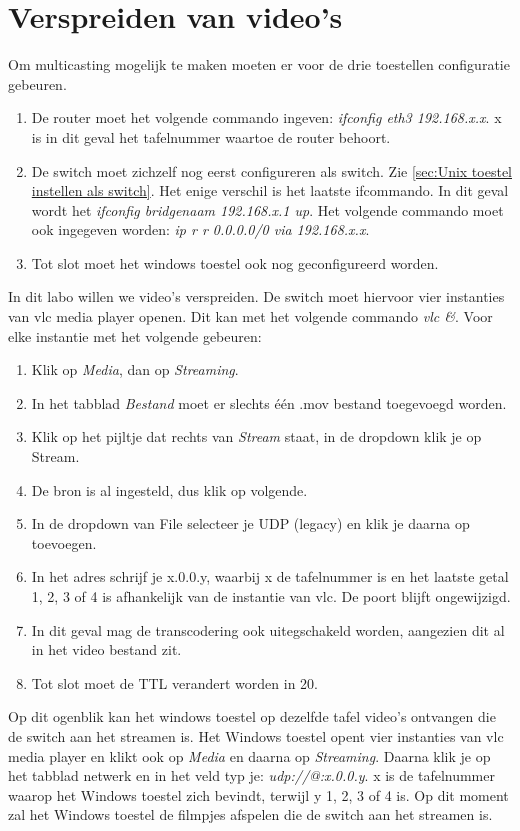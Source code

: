 \documentclass{report}
\begin{document}
\section{Verspreiden van video's}
Om multicasting mogelijk te maken moeten er voor de drie toestellen configuratie gebeuren.
\begin{enumerate}
	\item De router moet het volgende commando ingeven: \textit{ifconfig eth3 192.168.x.x}. x is in dit geval het tafelnummer waartoe de router behoort.
	\item De switch moet zichzelf nog eerst configureren als switch. Zie \ref{sec:Unix toestel instellen als switch}. Het enige verschil is het laatste ifcommando. In dit geval wordt het \textit{ifconfig bridgenaam 192.168.x.1 up}. Het volgende commando moet ook ingegeven worden: \textit{ip r r 0.0.0.0/0 via 192.168.x.x}.
	\item Tot slot moet het windows toestel ook nog geconfigureerd worden.
\end{enumerate} 

In dit labo willen we video's verspreiden. De switch moet hiervoor vier instanties van vlc media player openen. Dit kan met het volgende commando \textit{vlc \&}. Voor elke instantie met het volgende gebeuren:
\begin{enumerate}
	\item Klik op \textit{Media}, dan op \textit{Streaming}.
	\item In het tabblad \textit{Bestand} moet er slechts één .mov bestand toegevoegd worden.
	\item Klik op het pijltje dat rechts van \textit{Stream} staat, in de dropdown klik je op Stream.
	\item De bron is al ingesteld, dus klik op volgende.
	\item In de dropdown van File selecteer je UDP (legacy) en klik je daarna op toevoegen.
	\item In het adres schrijf je x.0.0.y, waarbij x de tafelnummer is en het laatste getal 1, 2, 3 of 4 is afhankelijk van de instantie van vlc. De poort blijft ongewijzigd.
	\item In dit geval mag de transcodering ook uitegschakeld worden, aangezien dit al in het video bestand zit.
	\item Tot slot moet de TTL verandert worden in 20.
\end{enumerate}

Op dit ogenblik kan het windows toestel op dezelfde tafel video's ontvangen die de switch aan het streamen is. Het Windows toestel opent vier instanties van vlc media player en klikt ook op \textit{Media} en daarna op \textit{Streaming}. Daarna klik je op het tabblad netwerk en in het veld typ je: \textit{udp://@:x.0.0.y}. x is de tafelnummer waarop het Windows toestel zich bevindt, terwijl y 1, 2, 3 of 4 is. Op dit moment zal het Windows toestel de filmpjes afspelen die de switch aan het streamen is.
\end{document}
